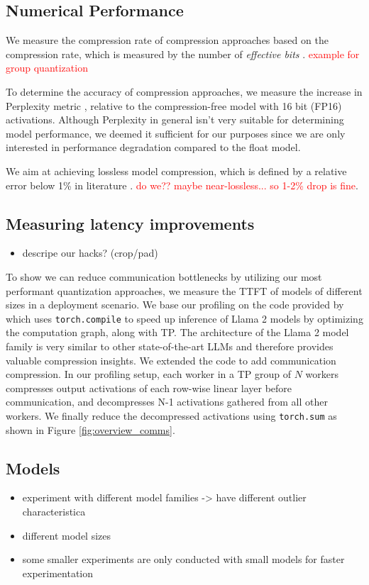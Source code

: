 \subsection{Numerical Performance}
We measure the compression rate of compression approaches based on the compression rate, which is measured by the number of \textit{effective bits} \parencite{gptq, awq}. \textcolor{red}{example for group quantization}

To determine the accuracy of compression approaches, we measure the increase in Perplexity metric \parencite{kvquant, atom, llmint8, outliersuppression}, relative to the compression-free model with 16 bit (FP16) activations. Although Perplexity in general isn't very suitable for determining model performance, we deemed it sufficient for our purposes since we are only interested in performance degradation compared to the float model.

We aim at achieving lossless model compression, which is defined by a relative error below 1\% in literature \parencite{mlperf}. \textcolor{red}{do we?? maybe near-lossless... so 1-2\% drop is fine}.

\subsection{Measuring latency improvements}
\begin{itemize}
	\item descripe our hacks? (crop/pad)
\end{itemize}

To show we can reduce communication bottlenecks by utilizing our most performant quantization approaches, we measure the TTFT of models of different sizes in a deployment scenario. We base our profiling on the code provided by \cite{ibmfms} which uses \verb|torch.compile| \parencite{torchcompile} to speed up inference of Llama 2 models by optimizing the computation graph, along with TP. The architecture of the Llama 2 model family is very similar to other state-of-the-art LLMs and therefore provides valuable compression insights. We extended the code to add communication compression. In our profiling setup, each worker in a TP group of $N$ workers compresses output activations of each row-wise linear layer before communication, and decompresses N-1 activations gathered from all other workers. We finally reduce the decompressed activations using \verb|torch.sum| as shown in Figure \ref{fig:overview_comms}.




\subsection{Models}
\begin{itemize}
    \item experiment with different model families -> have different outlier characteristica
    \item different model sizes
    \item some smaller experiments are only conducted with small models for faster experimentation
\end{itemize}

